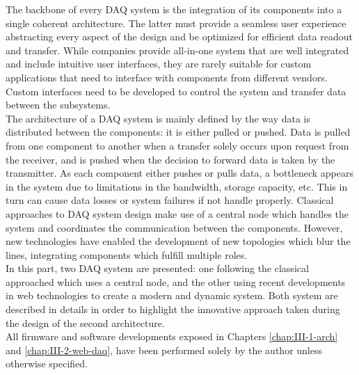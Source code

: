 The backbone of every DAQ system is the integration of its components into a single coherent architecture. The latter must provide a seamless user experience abstracting every aspect of the design and be optimized for efficient data readout and transfer. While companies provide all-in-one system that are well integrated and include intuitive user interfaces, they are rarely suitable for custom applications that need to interface with components from different vendors. Custom interfaces need to be developed to control the system and transfer data between the subsystems. \\

The architecture of a DAQ system is mainly defined by the way data is distributed between the components: it is either pulled or pushed. Data is pulled from one component to another when a transfer solely occurs upon request from the receiver, and is pushed when the decision to forward data is taken by the transmitter. As each component either pushes or pulls data, a bottleneck appears in the system due to limitations in the bandwidth, storage capacity, etc. This in turn can cause data losses or system failures if not handle properly. Classical approaches to DAQ system design make use of a central node which handles the system and coordinates the communication between the components. However, new technologies have enabled the development of new topologies which blur the lines, integrating components which fulfill multiple roles. \\

In this part, two DAQ system are presented: one following the classical approached which uses a central node, and the other using recent developments in web technologies to create a modern and dynamic system. Both system are described in details in order to highlight the innovative approach taken during the design of the second architecture. \\

All firmware and software developments exposed in Chapters \ref{chap:III-1-arch} and \ref{chap:III-2-web-daq}, have been performed solely by the author unless otherwise specified.
